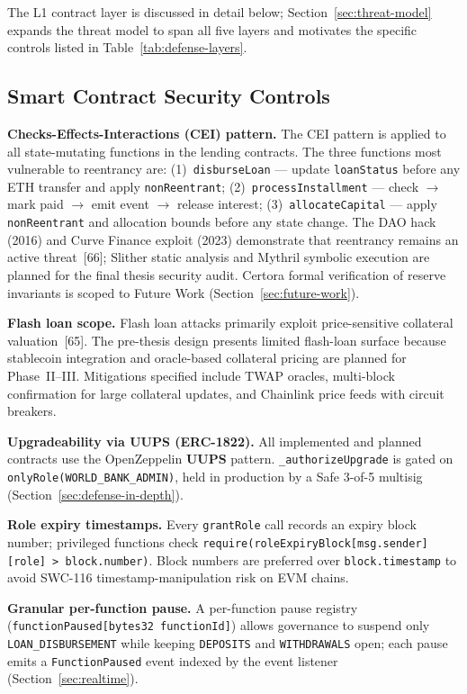 \documentclass[12pt,a4paper]{report}
\begin{document}
The L1 contract layer is discussed in detail below; Section~\ref{sec:threat-model} expands the threat model to span all five layers and motivates the specific controls listed in Table~\ref{tab:defense-layers}.

\subsection{Smart Contract Security Controls}
\label{sec:contract-security}

\textbf{Checks-Effects-Interactions (CEI) pattern.} The CEI pattern is applied to all state-mutating functions in the lending contracts. The three functions most vulnerable to reentrancy are: (1)~\texttt{disburseLoan} --- update \texttt{loanStatus} before any ETH transfer and apply \texttt{nonReentrant}; (2)~\texttt{processInstallment} --- check $\to$ mark paid $\to$ emit event $\to$ release interest; (3)~\texttt{allocateCapital} --- apply \texttt{nonReentrant} and allocation bounds before any state change. The DAO hack (2016) and Curve Finance exploit (2023) demonstrate that reentrancy remains an active threat~[66]; Slither static analysis and Mythril symbolic execution are planned for the final thesis security audit. Certora formal verification of reserve invariants is scoped to Future Work (Section~\ref{sec:future-work}).

\textbf{Flash loan scope.} Flash loan attacks primarily exploit price-sensitive collateral valuation~[65]. The pre-thesis design presents limited flash-loan surface because stablecoin integration and oracle-based collateral pricing are planned for Phase~II--III. Mitigations specified include TWAP oracles, multi-block confirmation for large collateral updates, and Chainlink price feeds with circuit breakers.

\textbf{Upgradeability via UUPS (ERC-1822).} All implemented and planned contracts use the OpenZeppelin \textbf{UUPS} pattern. \texttt{\_authorizeUpgrade} is gated on \texttt{onlyRole(WORLD\_BANK\_ADMIN)}, held in production by a Safe 3-of-5 multisig (Section~\ref{sec:defense-in-depth}).

\textbf{Role expiry timestamps.} Every \texttt{grantRole} call records an expiry block number; privileged functions check \texttt{require(roleExpiryBlock[msg.sender][role] > block.number)}. Block numbers are preferred over \texttt{block.timestamp} to avoid SWC-116 timestamp-manipulation risk on EVM chains.

\textbf{Granular per-function pause.} A per-function pause registry (\texttt{functionPaused[bytes32 functionId]}) allows governance to suspend only \texttt{LOAN\_DISBURSEMENT} while keeping \texttt{DEPOSITS} and \texttt{WITHDRAWALS} open; each pause emits a \texttt{FunctionPaused} event indexed by the event listener (Section~\ref{sec:realtime}).
\end{document}
